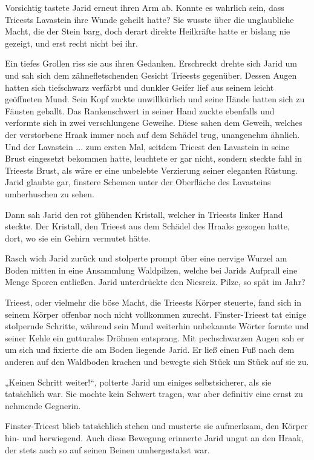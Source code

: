 Vorsichtig tastete Jarid erneut ihren Arm ab. Konnte es wahrlich sein, dass Trieests Lavastein ihre Wunde geheilt hatte? Sie wusste über die unglaubliche Macht, die der Stein barg, doch derart direkte Heilkräfte hatte er bislang nie gezeigt, und erst recht nicht bei ihr.

Ein tiefes Grollen riss sie aus ihren Gedanken. Erschreckt drehte sich Jarid um und sah sich dem zähnefletschenden Gesicht Trieests gegenüber. Dessen Augen hatten sich tiefschwarz verfärbt und dunkler Geifer lief aus seinem leicht geöffneten Mund. Sein Kopf zuckte unwillkürlich und seine Hände hatten sich zu Fäusten geballt. Das Rankenschwert in seiner Hand zuckte ebenfalls und verformte sich in zwei verschlungene Geweihe. Diese sahen dem Geweih, welches der verstorbene Hraak immer noch auf dem Schädel trug, unangenehm ähnlich. Und der Lavastein ... zum ersten Mal, seitdem Trieest den Lavastein in seine Brust eingesetzt bekommen hatte, leuchtete er gar nicht, sondern steckte fahl in Trieests Brust, als wäre er eine unbelebte Verzierung seiner eleganten Rüstung. Jarid glaubte gar, finstere Schemen unter der Oberfläche des Lavasteins umherhuschen zu sehen.

Dann sah Jarid den rot glühenden Kristall, welcher in Trieests linker Hand steckte. Der Kristall, den Trieest aus dem Schädel des Hraaks gezogen hatte, dort, wo sie ein Gehirn vermutet hätte.

Rasch wich Jarid zurück und stolperte prompt über eine nervige Wurzel am Boden mitten in eine Ansammlung Waldpilzen, welche bei Jarids Aufprall eine Menge Sporen entließen. Jarid unterdrückte den Niesreiz. Pilze, so spät im Jahr?

Trieest, oder vielmehr die böse Macht, die Trieests Körper steuerte, fand sich in seinem Körper offenbar noch nicht vollkommen zurecht. Finster-Trieest tat einige stolpernde Schritte, während sein Mund weiterhin unbekannte Wörter formte und seiner Kehle ein gutturales Dröhnen entsprang. Mit pechschwarzen Augen sah er um sich und fixierte die am Boden liegende Jarid. Er ließ einen Fuß nach dem anderen auf den Waldboden krachen und bewegte sich Stück um Stück auf sie zu.

„Keinen Schritt weiter!“, polterte Jarid um einiges selbstsicherer, als sie tatsächlich war. Sie mochte kein Schwert tragen, war aber definitiv eine ernst zu nehmende Gegnerin.

Finster-Trieest blieb tatsächlich stehen und musterte sie aufmerksam, den Körper hin- und herwiegend. Auch diese Bewegung erinnerte Jarid ungut an den Hraak, der stets auch so auf seinen Beinen umhergestakst war.

